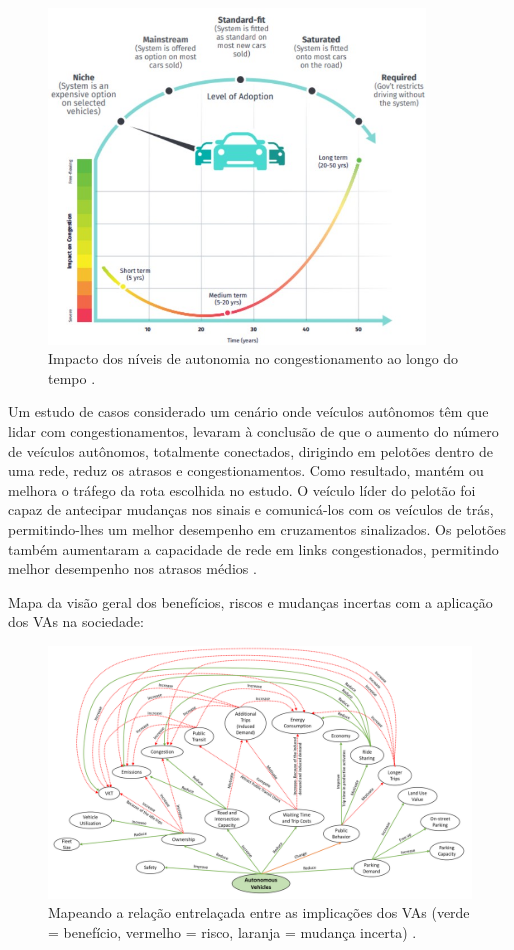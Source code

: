 \begin{figure}[H]
\centering
\includegraphics[width=10cm]{Figures/conge.jpg}
\caption{Impacto dos níveis de autonomia no congestionamento ao longo do tempo \cite{4cenarios_ocidental}.}
\label{congestionamento}
\end{figure}

Um estudo de casos considerado um cenário onde veículos autônomos têm que lidar com congestionamentos, levaram à conclusão de que o aumento do número de veículos autônomos, totalmente conectados, dirigindo em pelotões dentro de uma rede, reduz os atrasos e congestionamentos. Como resultado, mantém ou melhora o tráfego da rota escolhida no estudo. O veículo líder do pelotão foi capaz de antecipar mudanças nos sinais e comunicá-los com os veículos de trás, permitindo-lhes um melhor desempenho em cruzamentos sinalizados. Os pelotões também aumentaram a capacidade de rede em links congestionados, permitindo melhor desempenho nos atrasos médios \cite{conge}.

Mapa da visão geral dos benefícios, riscos e mudanças incertas com a aplicação dos VAs na sociedade:

\begin{figure}[H]
\centering
\includegraphics[width=16cm]{Figures/map.png}
\caption{Mapeando a relação entrelaçada entre as implicações dos VAs (verde = benefício, vermelho = risco, laranja = mudança incerta) \cite{mundobrasil}.}
\label{mapa_resumo}
\end{figure}


